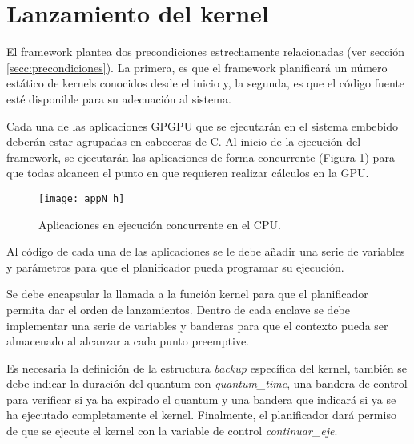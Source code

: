   

\section{Lanzamiento del kernel}\label{secc:lanzamientoKernel}

El framework plantea dos precondiciones estrechamente relacionadas (ver sección \ref{secc:precondiciones}). La primera, es que el framework planificará un número estático de kernels conocidos desde el inicio y, la segunda, es que el código fuente esté disponible para su adecuación al sistema.
\newline

Cada una de las aplicaciones GPGPU que se ejecutarán en el sistema embebido deberán estar agrupadas en cabeceras de C. Al inicio de la ejecución del framework, se ejecutarán las aplicaciones de forma concurrente (Figura \ref{fig:appN_h}) para que todas alcancen el punto en que requieren realizar cálculos en la GPU.
\newline 

  \begin{figure}[!]
      \centering
        \texttt{[image: appN\_h]}
        \caption{Aplicaciones en ejecución concurrente en el CPU.}
        \label{fig:appN_h}
    \end{figure}

Al código de cada una de las aplicaciones se le debe añadir una serie de variables y parámetros para que el planificador pueda programar su ejecución. 

Se debe encapsular la llamada a la función kernel para que el planificador permita dar el orden de lanzamientos. Dentro de cada enclave se debe implementar una serie de variables y banderas para que el contexto pueda ser almacenado al alcanzar a cada punto preemptive. 

Es necesaria la definición de la estructura \textit{backup} específica del kernel, también se debe indicar la duración del quantum con \textit{quantum\_time}, una bandera de control para verificar si ya ha expirado el quantum y una bandera que indicará si ya se ha ejecutado completamente el kernel. Finalmente, el planificador dará permiso de que se ejecute el kernel con la variable de control \textit{continuar\_eje}.
\newline

